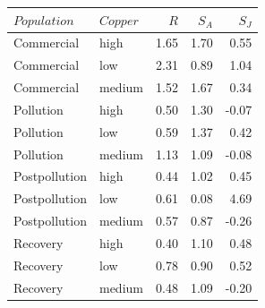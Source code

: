 \documentclass{article}\usepackage[]{graphicx}\usepackage[]{color}
\begin{document}
{\footnotesize
\begin{tabular}{llrrr}
  \toprule 
 $Population$ & $Copper$ & $R$ & $S_A$ & $S_J$ \\
 \midrule 
 Commercial & high & 1.65 & 1.70 & 0.55 \\ 
  Commercial & low & 2.31 & 0.89 & 1.04 \\ 
  Commercial & medium & 1.52 & 1.67 & 0.34 \\ 
  Pollution & high & 0.50 & 1.30 & -0.07 \\ 
  Pollution & low & 0.59 & 1.37 & 0.42 \\ 
  Pollution & medium & 1.13 & 1.09 & -0.08 \\ 
  Postpollution & high & 0.44 & 1.02 & 0.45 \\ 
  Postpollution & low & 0.61 & 0.08 & 4.69 \\ 
  Postpollution & medium & 0.57 & 0.87 & -0.26 \\ 
  Recovery & high & 0.40 & 1.10 & 0.48 \\ 
  Recovery & low & 0.78 & 0.90 & 0.52 \\ 
  Recovery & medium & 0.48 & 1.09 & -0.20 \\ 
   \bottomrule 
\end{tabular}
}
\end{document}

